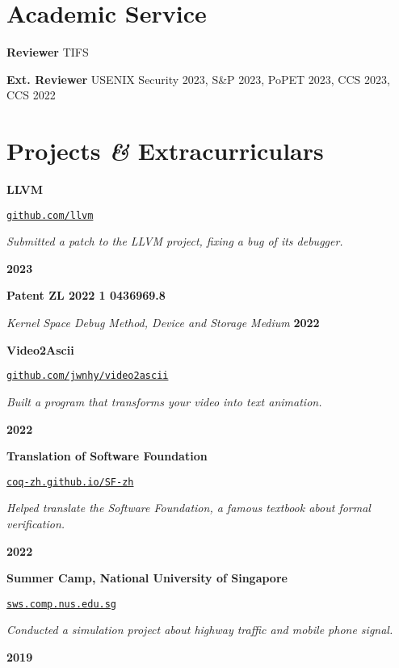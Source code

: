 \documentclass{resume}
\begin{document}
\section{Academic Service}
\begin{content}
  {\bf Reviewer} \enspace TIFS

  {\bf Ext. Reviewer} \enspace USENIX Security 2023, S\&P 2023, PoPET 2023, CCS 2023, CCS 2022
\end{content}

\section{Projects \textbf{\em\&} Extracurriculars} 

\begin{content}
	{\bf LLVM} \enspace 
	{\href{https://github.com/llvm/}{\texttt{github.com/llvm}}
		
	{\em Submitted a patch to the LLVM project, fixing a bug of its debugger.} }
	\hfill {\bf 2023}
	
	{\bf Patent ZL 2022 1 0436969.8} 
	
	{\em Kernel Space Debug Method, Device and Storage Medium}
	\hfill {\bf 2022}
	
    {\bf Video2Ascii} \enspace 
    {\href{https://github.com/jwnhy/video2ascii}{\texttt{github.com/jwnhy/video2ascii}}
    	
    {\em Built a program that transforms your video into text animation.} }
    \hfill {\bf 2022}
    
    {\bf Translation of Software Foundation} \enspace
    {\href{https://coq-zh.github.io/SF-zh/}{\texttt{coq-zh.github.io/SF-zh}}
    
    {\em Helped translate the Software Foundation, a famous textbook 
    about formal verification.}}
	\hfill {\bf 2022}
    
    {\bf Summer Camp, National University of Singapore} \enspace
    {\href{https://sws.comp.nus.edu.sg/}{\texttt{sws.comp.nus.edu.sg}}
    
    {\em Conducted a simulation project about highway traffic and mobile phone 
    signal.}}
    \hfill {\bf 2019}
    


\sectionlineskip    
\end{content}
\end{document}
